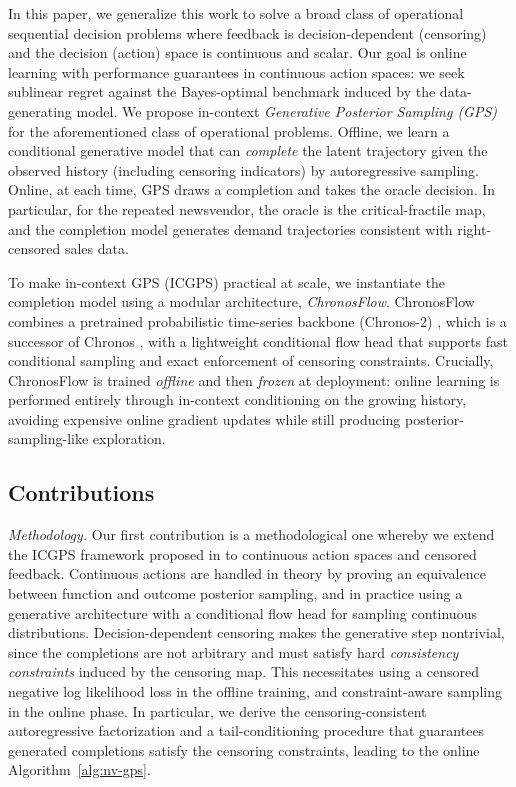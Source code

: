 \documentclass[11pt]{article}
\begin{document}
In this paper, we generalize this work to solve a broad class of operational sequential decision problems where feedback is decision-dependent (censoring) and the decision (action) space is continuous and scalar. 
Our goal is online learning with performance guarantees in continuous action spaces: we seek sublinear regret against the
Bayes-optimal benchmark induced by the data-generating model. We propose in-context \emph{Generative Posterior Sampling (GPS)} for the aforementioned class of operational problems. Offline, we learn a conditional generative model that can \emph{complete} the latent trajectory given the observed
history (including censoring indicators) by autoregressive sampling.
Online, at each time, GPS draws a completion and takes the oracle decision. In particular, for the repeated newsvendor, the oracle is the critical-fractile map, and the completion model generates demand trajectories consistent with right-censored sales data.




To make in-context GPS (ICGPS) practical at scale, we instantiate the completion model using a modular architecture, \emph{ChronosFlow}. ChronosFlow combines a pretrained probabilistic time-series backbone (Chronos-2) \citep{ansari2025chronos2}, which is a successor of Chronos \citep{ansari2024chronos}, with a lightweight
conditional flow head that supports fast conditional sampling and exact enforcement of censoring constraints. Crucially, ChronosFlow is trained \emph{offline} and then \emph{frozen} at deployment: online learning is performed entirely through in-context conditioning on the growing history, avoiding expensive online gradient updates while still producing posterior-sampling-like exploration. 


\subsection{Contributions}

\emph{Methodology.} Our first contribution is a methodological one whereby we extend the ICGPS framework proposed in \cite{cai2024active, zhang2025contextual} to continuous action spaces and censored feedback. Continuous actions are handled in theory by proving an equivalence between function and outcome posterior sampling, and in practice using a generative architecture with a conditional flow head for sampling continuous distributions. Decision-dependent censoring makes the generative step nontrivial, since the completions are not arbitrary and must satisfy hard \emph{consistency constraints} induced by the censoring map. This necessitates using a censored negative log likelihood loss in the offline training, and constraint-aware sampling in the online phase. In particular, we derive the censoring-consistent autoregressive factorization and a tail-conditioning procedure that guarantees generated completions satisfy the censoring constraints, leading to the online Algorithm~\ref{alg:nv-gps}.
\end{document}
